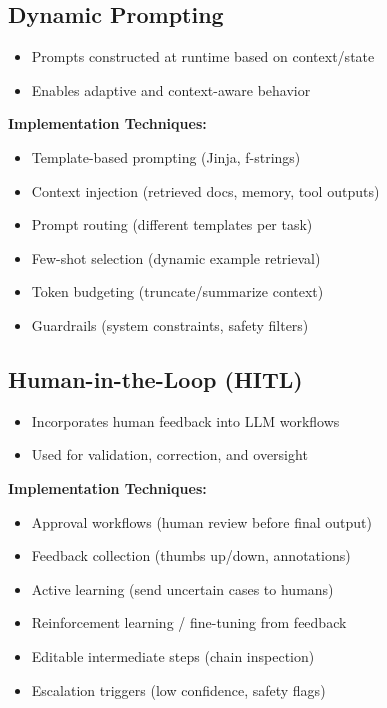 \documentclass[10pt,a4paper]{article}
\begin{document}
\vspace{0.5em}
\noindent
\subsection{Dynamic Prompting}

\begin{itemize}
\item Prompts constructed at runtime based on context/state
\item Enables adaptive and context-aware behavior
\end{itemize}

\textbf{Implementation Techniques:}
\begin{itemize}
\item Template-based prompting (Jinja, f-strings)
\item Context injection (retrieved docs, memory, tool outputs)
\item Prompt routing (different templates per task)
\item Few-shot selection (dynamic example retrieval)
\item Token budgeting (truncate/summarize context)
\item Guardrails (system constraints, safety filters)
\end{itemize}


\vspace{0.5em}
\noindent
\subsection{Human-in-the-Loop (HITL)}

\begin{itemize}
\item Incorporates human feedback into LLM workflows
\item Used for validation, correction, and oversight
\end{itemize}

\textbf{Implementation Techniques:}
\begin{itemize}
\item Approval workflows (human review before final output)
\item Feedback collection (thumbs up/down, annotations)
\item Active learning (send uncertain cases to humans)
\item Reinforcement learning / fine-tuning from feedback
\item Editable intermediate steps (chain inspection)
\item Escalation triggers (low confidence, safety flags)
\end{itemize}
\end{document}

